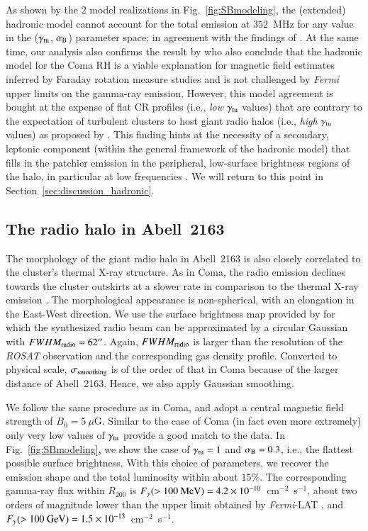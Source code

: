 \documentclass[useAMS,usenatbib]{mn2e}
\begin{document}
As shown by the 2 model realizations in Fig.~\ref{fig:SBmodeling}, the
(extended) hadronic model cannot account for the total emission at $352$~MHz for
any value in the ($\gamma_{{\mathrm{tu}}}$, $\alpha_{{\mathrm{B}}}$) parameter space; in
agreement with the findings of \citet{2012arXiv1207.3025B}. At the same time,
our analysis also confirms the result by \citet{2012...VERITAS} who also
conclude that the hadronic model for the Coma RH is a viable explanation
for magnetic field estimates inferred by Faraday rotation measure studies
\citep{2010A&A...513A..30B} and is not challenged by {\em Fermi} upper limits on
the gamma-ray emission. However, this model agreement is bought at the expense
of flat CR profiles (i.e., {\em low} $\gamma_{{\mathrm{tu}}}$ values) that are
contrary to the expectation of turbulent clusters to host giant radio halos
(i.e., {\em high} $\gamma_{{\mathrm{tu}}}$ values) as proposed by
\citet{2011A&A...527A..99E}. This finding hints at the necessity of a secondary,
leptonic component (within the general framework of the hadronic model) that
fills in the patchier emission in the peripheral, low-surface brightness regions
of the halo, in particular at low frequencies \cite[see Fig.~3
of][]{2011MNRAS.412....2B}. We will return to this point in
Section~\ref{sec:discussion_hadronic}.


\subsection{The radio halo in Abell~2163}

The morphology of the giant radio halo in Abell~2163 is also closely correlated
to the cluster's thermal X-ray structure. As in Coma, the radio emission declines
towards the cluster outskirts at a slower rate in comparison to the thermal
X-ray emission \citep{2001A&A...373..106F}. The morphological appearance is
non-spherical, with an elongation in the East-West direction. We use the surface
brightness map provided by \citet{2009A&A...499..679M} for which the synthesized
radio beam can be approximated by a circular Gaussian with
$FWHM_{{\mathrm{radio}}}=62\hbox{$^{\prime\prime}$}$.  Again, $FWHM_{{\mathrm{radio}}}$ is larger than the
resolution of the \emph{ROSAT} observation and the corresponding gas density
profile. Converted to physical scale, $\sigma_{{\mathrm{smoothing}}}$ is of the order
of that in Coma because of the larger distance of Abell~2163. Hence, we also apply
Gaussian smoothing.

We follow the same procedure as in Coma, and adopt a central magnetic field
strength of $B_{0}=5~\mu$G. Similar to the case of Coma (in fact even more
extremely) only very low values of $\gamma_{{\mathrm{tu}}}$ provide a good match to
the data.  In Fig.~\ref{fig:SBmodeling}, we show the case of
$\gamma_{{\mathrm{tu}}}=1$ and $ \alpha_{{\mathrm{B}}}=0.3$, i.e., the flattest possible surface
brightness. With this choice of parameters, we recover the emission shape and
the total luminosity within about $15\%$.  The corresponding gamma-ray flux
within $R_{200}$ is $F_{\gamma} (>100~{\mathrm{MeV}}) = 4.2
\times10^{-10}$~cm$^{-2}$~s$^{-1}$, about two orders of magnitude lower than the
upper limit obtained by \emph{Fermi}-LAT \citep{2010ApJ...717L..71A}, and
$F_{\gamma} (>100~{\mathrm{GeV}}) =1.5 \times10^{-13}$~cm$^{-2}$~s$^{-1}$.
\end{document}
